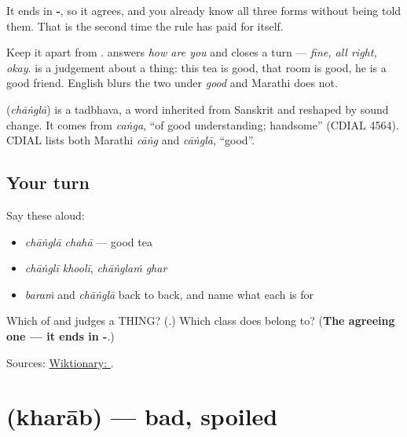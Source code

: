 It ends in \textbf{-}, so it agrees, and you already know all three forms without being told them. That is the second time the rule has paid for itself.

Keep it apart from \textbf{}. \textbf{} answers \emph{how are you} and closes a turn — \emph{fine, all right, okay}. \textbf{} is a judgement about a thing: this tea is good, that room is good, he is a good friend. English blurs the two under \emph{good} and Marathi does not.

\begin{cousinweb}
\textbf{} (\emph{chāṅglā}) is a tadbhava, a word inherited from Sanskrit and reshaped by sound change. It comes from \emph{caṅga}, \textquotedblleft{}of good understanding; handsome\textquotedblright{} (CDIAL 4564). CDIAL lists both Marathi \emph{cāṅg} and \emph{cāṅglā}, \textquotedblleft{}good\textquotedblright{}.
\end{cousinweb}

\subsection*{Your turn}
Say these aloud:

\begin{itemize}
\raggedright
  \item \emph{chāṅglā chahā} — good tea
  \item \emph{chāṅglī khoolī}, \emph{chāṅglaṁ ghar}
  \item \emph{baraṁ} and \emph{chāṅglā} back to back, and name what each is for
\end{itemize}

\begin{tcolorbox}[breakable,colback=teal!4,colframe=teal!35!black,title={Before you move on}]
Which of \textbf{} and \textbf{} judges a THING? (\textbf{}.) Which class does \textbf{} belong to? (\textbf{The agreeing one — it ends in -}.)

Sources: \href{https://en.wiktionary.org/wiki/\%E0\%A4\%9A\%E0\%A4\%BE\%E0\%A4\%82\%E0\%A4\%97\%E0\%A4\%B2\%E0\%A4\%BE}{Wiktionary: }.
\end{tcolorbox}
\section[\texorpdfstring{\mr{खराब} (kharāb)}{खराब (kharāb)}]{ (kharāb) — bad, spoiled}

\label{lesson:MR-C51-kharaab}



